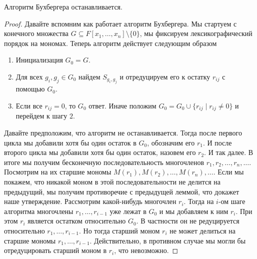 \begin{claim}
Алгоритм Бухбергера останавливается.
\end{claim}
\begin{proof}
Давайте вспомним как работает алгоритм Бухбергера.
Мы стартуем с конечного множества $G \subseteq F[x_1,\ldots, x_n]\setminus\{0\}$, мы фиксируем лексикографический порядок на мономах.
Теперь алгоритм действует следующим образом
\begin{enumerate}
\item Инициализация $G_0 = G$.

\item Для всех $g_i,g_j\in G_0$ найдем $S_{g_i, g_j}$ и отредуцируем его к остатку $r_{ij}$ с помощью  $G_0$.

\item Если все $r_{ij} = 0$, то $G_0$ ответ.
Иначе положим $G_0 = G_0 \cup \{r_{ij}\mid r_{ij}\neq 0\}$ и перейдем к шагу $2$.
\end{enumerate}
Давайте предположим, что алгоритм не останавливается.
Тогда после первого цикла мы добавили хотя бы один остаток в $G_0$, обозначим его $r_1$.
И после второго цикла мы добавили хотя бы один остаток, назовем его $r_2$.
И так далее.
В итоге мы получим бесконечную последовательность многочленов $r_1,r_2,\ldots, r_n,\ldots$.
Посмотрим на их старшие мономы $M(r_1), M(r_2), \ldots, M(r_n),\ldots$.
Если мы покажем, что никакой моном в этой последовательности не делится на предыдущий, мы получим противоречие с предыдущей леммой, что докажет наше утверждение.
Рассмотрим какой-нибудь многочлен $r_i$.
Тогда на $i$-ом шаге алгоритма многочлены $r_1,\ldots, r_{i-1}$ уже лежат в $G_0$ и мы добавляем к ним $r_i$.
При этом $r_i$ является остатком относительно $G_0$.
В частности он не редуцируется относительно $r_1,\ldots, r_{i-1}$.
Но тогда старший моном $r_i$ не может делиться на старшие мономы $r_1,\ldots,r_{i-1}$.
Действительно, в противном случае мы могли бы отредуцировать старший моном в $r_i$, что невозможно.
\end{proof}
